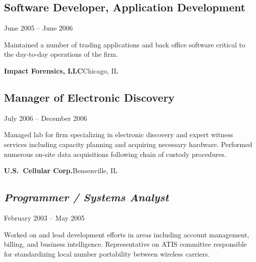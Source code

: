 {

\vskip 5pt
\subsection{Software Developer, Application Development}
    {June 2005 -- June 2006}

Maintained a number of trading applications and back office software
critical to the day-to-day operations of the firm.




\vskip 10pt

{\bf Impact Forensics, LLC}\quad Chicago, IL

\subsection{Manager of Electronic Discovery}
    {July 2006 -- December 2006}

Managed lab for firm specializing in electronic discovery and expert
witness services including capacity planning and acquiring necessary
hardware.  Performed numerous on-site data acquisitions following
chain of custody procedures.

\vskip 10pt

{\bf U.S.~Cellular Corp.}\quad Bensenville, IL

\subsection{\sl Programmer / Systems Analyst}
    {February 2003 -- May 2005}

Worked on and lead development efforts in areas including account
management, billing, and business intelligence.  Representative on ATIS
committee responsible for standardizing local number portability between
wireless carriers.

}
